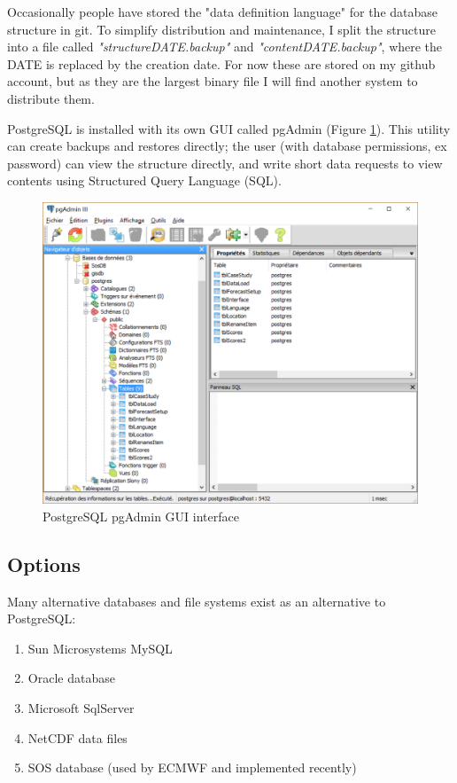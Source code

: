 \documentclass[logos,parttoc,morelanguage=french,morelanguage=german,draft]{orsay-memoire}
\begin{document}
Occasionally people have stored the "data definition language" for the database structure in git. To simplify distribution and maintenance, I split the structure into a file called \textit{"structureDATE.backup"} and \textit{"contentDATE.backup"}, where the DATE is replaced by the creation date. For now these are stored on my github account, but as they are the largest binary file I will find another system to distribute them.

PostgreSQL is installed with its own GUI called pgAdmin (Figure \ref{fig:pgAdmin}). This utility can create backups and restores directly; the user (with database permissions, ex password) can view the structure directly, and write short data requests to view contents using Structured Query Language (SQL).

\begin{figure}[H]
\centering
\includegraphics[width=0.7\linewidth]{images/pgAdmin1.png}
  \caption{PostgreSQL pgAdmin GUI interface}
  \label{fig:pgAdmin}
\end{figure}

\subsection{Options}

Many alternative databases and file systems exist as an alternative to PostgreSQL:

\begin{enumerate}
\item Sun Microsystems MySQL
\item Oracle database
\item Microsoft SqlServer
\item NetCDF data files
\item SOS database (used by ECMWF and implemented recently)
\end{enumerate}
\end{document}
